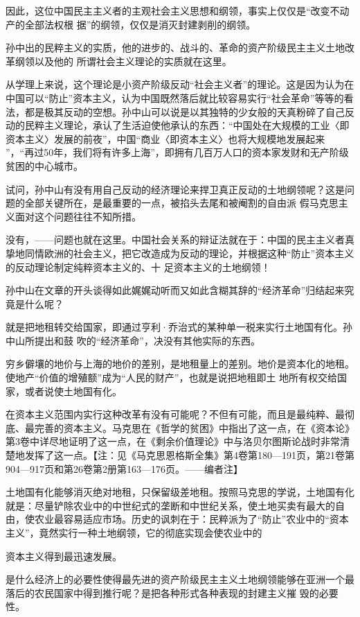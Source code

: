 \documentclass{article}
\begin{document}
因此，这位中国民主主义者的主观社会主义思想和纲领，事实上仅仅是“改变不动产的全部法权根
据”的纲领，仅仅是消灭封建剥削的纲领。 

孙中出的民粹主义的实质，他的进步的、战斗的、革命的资产阶级民主主义土地改革纲领以及他的
所谓社会主义理论的实质就在这里。 

从学理上来说，这个理论是小资产阶级反动“社会主义者”的理论。这是因为认为在中国可以“防止”资本主义，认为中国既然落后就比较容易实行“社会革命”等等的看法，都是极其反动的空想。孙中山可以说是以其独特的少女般的天真粉碎了自己反动的民粹主义理论，承认了生活迫使他承认的东西：“中国处在大规模的工业〈即资本主义〉发展的前夜”，中国“商业〈即资本主义〉也将大规模地发展起来
\newpage
”，“再过50年，我们将有许多上海”，即拥有几百万人口的资本家发财和无产阶级贫困的中心城市。

试问，孙中山有没有用自己反动的经济理论来捍卫真正反动的土地纲领呢？这是问题的全部关键所在，是最重要的一点，被掐头去尾和被阉割的自由派
假马克思主义面对这个问题往往不知所措。 

没有，——问题也就在这里。中国社会关系的辩证法就在于：中国的民主主义者真挚地同情欧洲的社会主义，把它改造成为反动的理论，并根据这种“防止”资本主义的反动理论制定纯粹资本主义的、十
足资本主义的土地纲领！ 

孙中山在文章的开头谈得如此娓娓动听而又如此含糊其辞的“经济革命”归结起来究竟是什么呢？

就是把地租转交给国家，即通过亨利·乔治式的某种单一税来实行土地国有化。孙中山所提出和鼓
吹的“经济革命”，决没有其他实际的东西。 

\newpage

穷乡僻壤的地价与上海的地价的差别，是地租量上的差别。地价是资本化的地租。使地产“价值的增殖额”成为“人民的财产”，也就是说把地租即土
地所有权交给国家，或者说使土地国有化。 

在资本主义范围内实行这种改革有没有可能呢？不但有可能，而且是最纯粹、最彻底、最完善的资本主义。马克思在《哲学的贫困》中指出了这一点，在《资本论》第3卷中详尽地证明了这一点，在《剩余价值理论》中与洛贝尔图斯论战时非常清楚地发挥了这一点。【注：见《马克思恩格斯全集》第4卷第180—191页，第21卷第904—917页和第26卷第2册第163—176页。——编者注】

土地国有化能够消灭绝对地租，只保留级差地租。按照马克思的学说，土地国有化就是：尽量铲除农业中的中世纪式的垄断和中世纪关系，使土地买卖有最大的自由，使农业最容易适应市场。历史的讽刺在于：民粹派为了“防止”农业中的“资本主义”，竟然实行一种土地纲领，它的彻底实现会使农业中的

\newpage
资本主义得到最迅速发展。 

是什么经济上的必要性使得最先进的资产阶级民主主义土地纲领能够在亚洲一个最落后的农民国家中得到推行呢？是把各种形式各种表现的封建主义摧
毁的必要性。 
\end{document}
